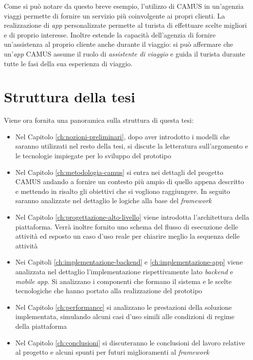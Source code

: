 Come si può notare da questo breve esempio, l'utilizzo di CAMUS in un'agenzia viaggi permette di fornire un servizio più coinvolgente ai propri clienti. La realizzazione di \emph{app} personalizzate permette al turista di effettuare scelte migliori e di proprio interesse. Inoltre estende la capacità dell'agenzia di fornire un'assistenza al proprio cliente anche durante il viaggio: si può affermare che un'\emph{app} CAMUS assume il ruolo di \emph{assistente di viaggio} e guida il turista durante tutte le fasi della sua esperienza di viaggio.

\section{Struttura della tesi}

Viene ora fornita una panoramica sulla struttura di questa tesi:

\begin{itemize}
	\item 
	Nel Capitolo \ref{ch:nozioni-preliminari}, dopo aver introdotto i modelli che saranno utilizzati nel resto della tesi, si discute la letteratura sull'argomento e le tecnologie impiegate per lo sviluppo del prototipo
	\item 
	Nel Capitolo \ref{ch:metodologia-camus} si entra nei dettagli del progetto CAMUS andando a fornire un contesto più ampio di quello appena descritto e mettendo in risalto gli obiettivi che si vogliono raggiungere. In seguito saranno analizzate nel dettaglio le logiche alla base del \emph{framework}
	\item 
	Nel Capitolo \ref{ch:progettazione-alto-livello} viene introdotta l'architettura della piattaforma. Verrà inoltre fornito uno schema del flusso di esecuzione delle attività ed esposto un caso d'uso reale per chiarire meglio la sequenza delle attività
	\item 
	Nei Capitoli \ref{ch:implementazione-backend} e \ref{ch:implementazione-app} viene analizzata nel dettaglio l'implementazione rispettivamente lato \emph{backend} e \emph{mobile app}. Si analizzano i componenti che formano il sistema e le scelte tecnologiche che hanno portato alla realizzazione del prototipo
	\item 
	Nel Capitolo \ref{ch:performance} si analizzano le prestazioni della soluzione implementata, simulando alcuni casi d'uso simili alle condizioni di regime della piattaforma
	\item 
	Nel Capitolo \ref{ch:conclusioni} si discuteranno le conclusioni del lavoro relative al progetto e alcuni spunti per futuri miglioramenti al \emph{framework}
\end{itemize}